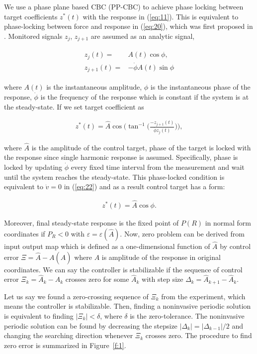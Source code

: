 \documentclass[openacc]{rsproca_new}%
\def\epsilon{\varepsilon}
\newcommand{\Eref}[1]{(\ref{#1})}
\newcommand{\Fref}[1]{Figure~\ref{#1}}
\begin{document}
We use a phase plane based CBC (PP-CBC) to achieve phase locking between target coefficients $z^*(t)$ with the response in \Eref{eq:11}. This is equivalent to phase-locking between force and response in \Eref{eq:20}, which was first proposed in \cite{irene}. Monitored signals $z_j$, $z_{j+1}$  are assumed as an analytic signal,

\begin{align}\label{eq:25}
\begin{split}
z_{j}(t)=&A(t)\cos{\phi},\\
z_{j+1}(t)=&-\dot\phi A(t)\sin{\phi}
\end{split}
\end{align}

\noindent where $A(t)$ is the instantaneous amplitude, $\phi$ is the instantaneous phase of the response, $\dot\phi$ is the frequency of the response which is constant if the system is at the steady-state. If we set target coefficient as

\begin{align}\label{eq:26}
z^*(t)=\hat A\cos\Big(\tan^{-1}\Big({\frac{-z_{j+1}(t)}{ \dot \phi z_{j}(t)}}\Big) \Big),
\end{align}

\noindent where $\hat A$ is the amplitude of the control target, phase of the target is locked with the response since single harmonic response is assumed. Specifically, phase is locked by updating $\dot\phi$ every fixed time interval from the measurement and wait until the system reaches the steady-state. This phase-locked condition is equivalent to $\dot v=0$ in \Eref{eq:22} and as a result control target has a form:

\begin{align}\label{eq:tg}
 z^*(t)=\hat A\cos{\phi}.
\end{align}

\noindent Moreover, final steady-state response is the fixed point of $P(R)$ in normal form coordinates if $P_R<0$ with $\epsilon=\epsilon(\hat A)$. Now, zero problem can be derived from input output map which is defined as a one-dimensional function of $\hat A$ by control error $\Xi=\hat A - A(\hat A)$ where $A$ is amplitude of the response in original coordinates. We can say the controller is stabilizable if the sequence of control error $\Xi_k=\hat A_k-A_k$ crosses zero for some $\hat A_k$ with step size $\Delta_k=\hat A_{k+1}-\hat A_{k}$.

Let us say we found a zero-crossing sequence of $\Xi_k$ from the experiment, which means the controller is stabilizable. Then, finding a noninvasive periodic solution is equivalent to finding  $|\Xi_k|<\delta$, where $\delta$ is the zero-tolerance. The noninvasive periodic solution can be found by decreasing the stepsize $|\Delta_k|=|\Delta_{k-1}|/2$ and changing the searching direction whenever $\Xi_k$ crosses zero. The procedure to find zero error is summarized in \Fref{f:1}.
\end{document}
